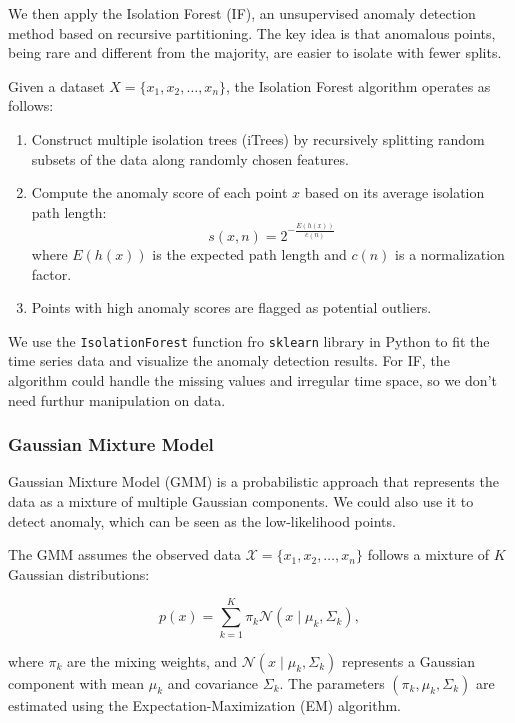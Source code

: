 \documentclass[
]{article}
\begin{document}
We then apply the Isolation Forest (IF), an unsupervised anomaly detection method based on recursive partitioning. The key idea is that anomalous points, being rare and different from the majority, are easier to isolate with fewer splits.

Given a dataset \(X = \{x_1, x_2, \dots, x_n\}\), the Isolation Forest algorithm operates as follows:

\begin{enumerate}
    \item Construct multiple isolation trees (iTrees) by recursively splitting random subsets of the data along randomly chosen features.
    \item Compute the anomaly score of each point $x$ based on its average isolation path length:
    \begin{equation}
        s(x, n) = 2^{-\frac{E(h(x))}{c(n)}}
    \end{equation}
    where $E(h(x))$ is the expected path length and $c(n)$ is a normalization factor.
    \item Points with high anomaly scores are flagged as potential outliers.
\end{enumerate}

We use the \texttt{IsolationForest} function fro \texttt{sklearn} library in Python to fit the time series data and visualize the anomaly detection results. For IF, the algorithm could handle the missing values and irregular time space, so we don't need furthur manipulation on data.

\subsubsection{Gaussian Mixture Model}\label{gaussian-mixture-model}

Gaussian Mixture Model (GMM) is a probabilistic approach that represents the data as a mixture of multiple Gaussian components. We could also use it to detect anomaly, which can be seen as the low-likelihood points.

The GMM assumes the observed data \(\mathcal{X} = \{x_1, x_2, \dots, x_n\}\) follows a mixture of \(K\) Gaussian distributions:

\begin{equation}
    p(x) = \sum_{k=1}^{K} \pi_k \mathcal{N}(x \mid \mu_k, \Sigma_k),
\end{equation}

where \(\pi_k\) are the mixing weights, and \(\mathcal{N}(x \mid \mu_k, \Sigma_k)\) represents a Gaussian component with mean \(\mu_k\) and covariance \(\Sigma_k\). The parameters \((\pi_k, \mu_k, \Sigma_k)\) are estimated using the Expectation-Maximization (EM) algorithm.
\end{document}
